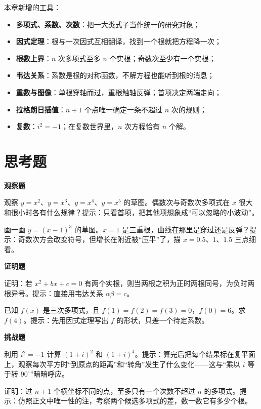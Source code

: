 \begin{toolbox}
本章新增的工具：
\begin{itemize}
\item \textbf{多项式、系数、次数}：把一大类式子当作统一的研究对象；
\item \textbf{因式定理}：根与一次因式互相翻译，找到一个根就把方程降一次；
\item \textbf{根数上界}：$n$ 次多项式至多 $n$ 个实根；奇数次至少有一个实根；
\item \textbf{韦达关系}：系数是根的对称函数，不解方程也能听到根的消息；
\item \textbf{重数与图像}：单根穿轴而过，重根触轴反弹；首项决定两端走向；
\item \textbf{拉格朗日插值}：$n+1$ 个点唯一确定一条不超过 $n$ 次的规则；
\item \textbf{复数}：$i^2=-1$；在复数世界里，$n$ 次方程恰有 $n$ 个解。
\end{itemize}
\end{toolbox}

\section*{思考题}

\textbf{观察题}
\begin{sikao}
\item 观察 $y=x^2$、$y=x^3$、$y=x^4$、$y=x^5$ 的草图。偶数次与奇数次多项式在 $x$ 很大和很小时各有什么规律？提示：只看首项，把其他项想象成“可以忽略的小波动”。
\item 画一画 $y=(x-1)^3$ 的草图。$x=1$ 是三重根，曲线在那里是穿过还是反弹？提示：奇数次方会改变符号，但增长在附近被“压平”了，描 $x=0.5$、$1$、$1.5$ 三点细看。
\end{sikao}

\textbf{证明题}
\begin{sikao}
\item 证明：若 $x^2+bx+c=0$ 有两个实根，则当两根之积为正时两根同号，为负时两根异号。提示：直接用韦达关系 $\alpha\beta=c$。
\item 已知 $f(x)$ 是三次多项式，且 $f(1)=f(2)=f(3)=0$，$f(0)=6$。求 $f(4)$。提示：先用因式定理写出 $f$ 的形状，只差一个待定系数。
\end{sikao}

\textbf{挑战题}
\begin{sikao}
\item 利用 $i^2=-1$ 计算 $(1+i)^2$ 和 $(1+i)^4$。提示：算完后把每个结果标在复平面上，观察每次平方时“到原点的距离”和“转角”发生了什么变化——这与“乘以 $i$ 等于转 $90^\circ$”暗暗呼应。
\item 证明：过 $n+1$ 个横坐标不同的点，至多只有一个次数不超过 $n$ 的多项式。提示：仿照正文中唯一性的注，考察两个候选多项式的差，数一数它有多少个根。
\end{sikao}

